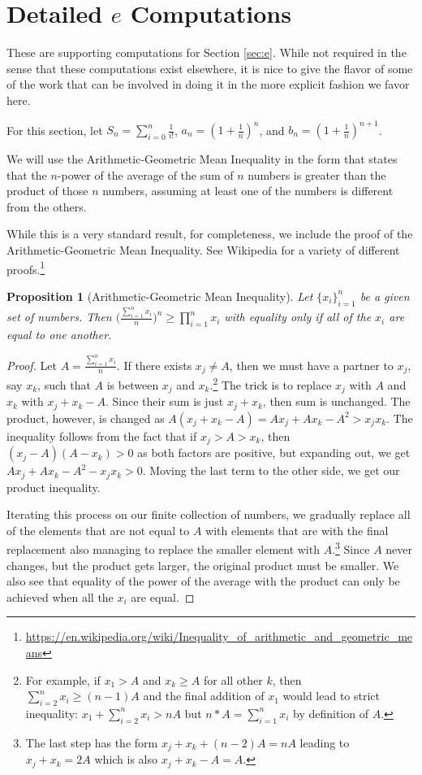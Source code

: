 \documentclass[12pt]{article}
\newtheorem{proposition}{Proposition}[subsection]
\begin{document}
\section{Detailed \texorpdfstring{$e$}{e} Computations}\label{app:e}

These are supporting computations for Section \ref{sec:e}. While not required in the sense that these computations exist elsewhere, it is nice to give the flavor of some of the work that can be involved in doing it in the more explicit fashion we favor here. 

For this section, let $S_n = \sum_{i=0}^n \frac{1}{i!}$, $a_n = (1+\frac{1}{n})^{n}  $, and $b_n = (1+\frac{1}{n})^{n+1}$.

We will use the Arithmetic-Geometric Mean Inequality in the form that states that the $n$-power of the average of the sum of $n$ numbers is greater than the product of those $n$ numbers, assuming at least one of the numbers is different from the others. 

While this is a very standard result, for completeness, we include the proof of the Arithmetic-Geometric Mean Inequality. See Wikipedia for a variety of different proofs.\footnote{\url{https://en.wikipedia.org/wiki/Inequality_of_arithmetic_and_geometric_means}}

\begin{proposition}[Arithmetic-Geometric Mean Inequality]
    Let $\{x_i\}_{i=1}^n$ be a given set of numbers. Then $\big(\frac{\sum_{i=1}^n x_i}{n}\big)^n \geq  \prod_{i=1}^n x_i$ with equality only if all of the $x_i$ are equal to one another. 
\end{proposition}

\begin{proof}
    Let $A = \frac{\sum_{i=1}^n x_i}{n}$. If there exists $x_j \neq A$, then we must have a partner to $x_j$, say $x_k$, such that $A$ is between $x_j$ and $x_k$.\footnote{For example, if $x_1 > A$ and $x_k \geq A$ for all other $k$, then $\sum_{i=2}^n x_i \geq (n-1) A$ and the final addition of $x_1$ would lead to strict inequality: $x_1 + \sum_{i=2}^n x_i > n A$ but $n*A = \sum_{i=1}^n x_i$ by definition of $A$.} The trick is to replace $x_j$ with $A$ and $x_k$ with $x_j + x_k - A$. Since their sum is just $x_j + x_k$, then sum is unchanged. The product, however, is changed as $A(x_j + x_k - A) = Ax_j + A x_k - A^2 > x_j x_k$. The inequality follows from the fact that if $x_j > A > x_k$, then $(x_j - A)(A-x_k) > 0$ as both factors are positive, but expanding out, we get $A x_j + Ax_k - A^2 - x_j x_k > 0$. Moving the last term to the other side, we get our product inequality. 

    Iterating this process on our finite collection of numbers, we gradually replace all of the elements that are not equal to $A$ with elements that are with the final replacement also managing to replace the smaller element with $A$.\footnote{The last step has the form $x_j + x_k + (n-2)A = n A$ leading to $x_j +x_k = 2A$ which is also $x_j + x_k - A = A$.} Since $A$ never changes, but the product gets larger, the original product must be smaller. We also see that equality of the power of the average with the product can only be achieved when all the $x_i$ are equal.  
\end{proof}
\end{document}
